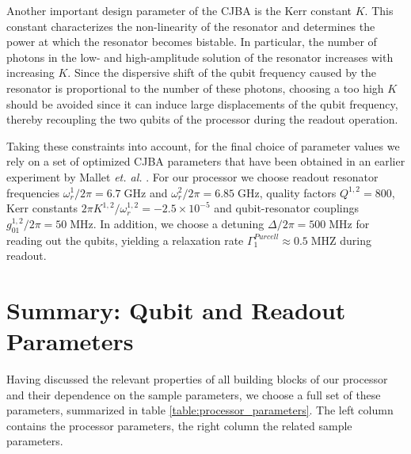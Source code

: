 \smallskip

Another important design parameter of the CJBA is the Kerr constant $K$. This constant characterizes the non-linearity of the resonator and determines the power at which the resonator becomes bistable. In particular, the number of photons in the low- and high-amplitude solution of the resonator increases with increasing $K$. Since the dispersive shift of the qubit frequency caused by the resonator is proportional to the number of these photons, choosing a too high $K$ should be avoided since it can induce large displacements of the qubit frequency, thereby recoupling the two qubits of the processor during the readout operation. 

\smallskip

Taking these constraints into account, for the final choice of parameter values we rely on a set of optimized CJBA parameters that have been obtained in an earlier experiment by Mallet {\it et. al.} \citep{mallet_single-shot_2009}. For our processor we choose readout resonator frequencies $\omega_r^1/2\pi = 6.7 \;\mathrm{GHz}$ and $\omega_r^2/2\pi = 6.85\;\mathrm{GHz}$, quality factors $Q^{1,2}=800$, Kerr constants $2\pi K^{1,2}/\omega_r^{1,2}=-2.5\times 10^{-5}$ and qubit-resonator couplings $g_{01}^{1,2}/2\pi=50\;\mathrm{MHz}$. In addition, we choose a detuning $\Delta/2\pi = 500\;\mathrm{MHz}$ for reading out the qubits, yielding a relaxation rate $\Gamma^{Purcell}_1\approx 0.5\;\mathrm{MHZ}$ during readout.

\section{Summary: Qubit and Readout Parameters}

Having discussed the relevant properties of all building blocks of our processor and their dependence on the sample parameters, we choose a full set of these parameters, summarized in table \ref{table:processor_parameters}. The left column contains the processor parameters, the right column the related sample parameters.

